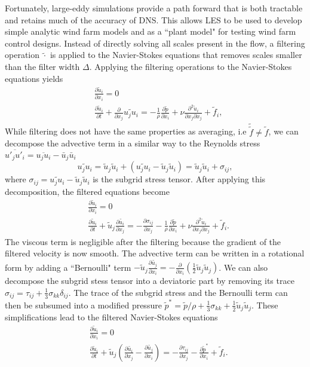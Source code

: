 Fortunately, large-eddy simulations provide a path forward that is both tractable and retains much of the accuracy of DNS. This allows LES to be used to develop simple analytic wind farm models and as a ``plant model" for testing wind farm control designs. Instead of directly solving all scales present in the flow, a filtering operation $\widetilde{\cdot}$ is applied to the Navier-Stokes equations that removes scales smaller than the filter width $\Delta$. Applying the filtering operations to the Navier-Stokes equations yields
\begin{align}
&\frac{\partial \tilde{u}_i}{\partial x_i} = 0 \\
&\frac{\partial \tilde{u}_i}{\partial t} + \frac{\partial}{\partial x_j} \widetilde{u_j u_i} = - \frac{1}{\rho}\frac{\partial \tilde{p}}{\partial x_i} + \nu \frac{\partial^2 \tilde{u}_i}{\partial x_j \partial x_j} + \tilde{f}_i,
\end{align}
While filtering does not have the same properties as averaging, i.e $\tilde{\tilde{f}} \ne \tilde{f}$, we can decompose the advective term in a similar way to the Reynolds stress $\overline{u'_ju'_i} = \overline{u_ju_i} - \bar{u}_j\bar{u}_i$
\begin{equation}
\widetilde{u_j u_i} = \tilde{u}_j \tilde{u}_i + \left(   \widetilde{u_j u_i} - \tilde{u}_j \tilde{u}_i \right) = \tilde{u}_j \tilde{u}_i  + \sigma_{ij},
\end{equation}
where $\sigma_{ij} = \widetilde{u_j u_i} - \tilde{u}_j \tilde{u}_i$ is the subgrid stress tensor. After applying this decomposition, the filtered equations become
\begin{align}
&\frac{\partial \tilde{u}_i}{\partial x_i} = 0 \\
&\frac{\partial \tilde{u}_i}{\partial t} +\tilde{u}_j \frac{\partial \tilde{u_i}}{\partial x_j}  =  - \frac{\partial \sigma_{ij}}{\partial x_j}  - \frac{1}{\rho}\frac{\partial \tilde{p}}{\partial x_i} + \nu \frac{\partial^2 \tilde{u}_i}{\partial x_j \partial x_j} + \tilde{f}_i.
\end{align}
The viscous term is negligible after the filtering because the gradient of the filtered velocity is now smooth. The advective term can be written in a rotational form by adding a ``Bernoulli" term $-\tilde{u}_j \frac{\partial \tilde{u_j}}{\partial x_i} = - \frac{\partial}{\partial x_i} \left(\frac{1}{2}\tilde{u}_j \tilde{u}_j \right)$. We can also decompose the subgrid stess tensor into a deviatoric part by removing its trace $\sigma_{ij} = \tau_{ij} + \frac{1}{3}\sigma_{kk} \delta_{ij}$. The trace of the subgrid stress and the Bernoulli term can then be subsumed into a modified pressure $\tilde{p}^* = \tilde{p}/\rho + \frac{1}{3}\sigma_{kk} + \frac{1}{2}\tilde{u}_j \tilde{u}_j $. These simplifications lead to the filtered Navier-Stokes equations
\begin{align}
&\frac{\partial \tilde{u}_i}{\partial x_i} = 0 \\
&\frac{\partial \tilde{u}_i}{\partial t} +\tilde{u}_j \left( \frac{\partial \tilde{u_i}}{\partial x_j}  - \frac{\partial \tilde{u_j}}{\partial x_i} \right)=  - \frac{\partial \tau_{ij}}{\partial x_j}  - \frac{\partial \tilde{p}^*}{\partial x_i} + \tilde{f}_i.
\end{align}


